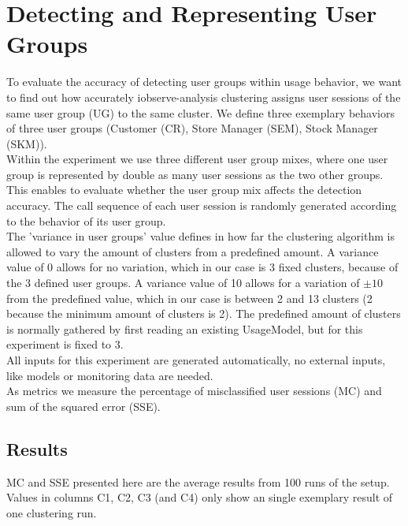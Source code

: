 \documentclass[10pt,a4paper]{article}
\begin{document}
	\section{Detecting and Representing User Groups}
	To evaluate the accuracy of detecting user groups within usage behavior, we want to find out how accurately iobserve-analysis clustering assigns user sessions of the same user group (UG) to the same cluster. We define three exemplary behaviors of three user groups (Customer (CR), Store Manager (SEM), Stock Manager (SKM)).\\
	Within the experiment we use three different user group mixes, where one user group is represented by double as many user sessions as the two other groups. This enables to evaluate whether the user group mix affects the detection accuracy. The call sequence of each user session is randomly generated according to the behavior of its user group.\\
	The 'variance in user groups' value defines in how far the clustering algorithm is allowed to vary the amount of clusters from a predefined amount. A variance value of 0 allows for no variation, which in our case is 3 fixed clusters, because of the 3 defined user groups. A variance value of 10 allows for a variation of $\pm 10 $ from the predefined value, which in our case is between 2 and 13 clusters (2 because the minimum amount of clusters is 2). The predefined amount of clusters is normally gathered by first reading an existing UsageModel, but for this experiment is fixed to 3.\\
	All inputs for this experiment are generated automatically, no external inputs, like models or monitoring data are needed.\\
	As metrics we measure the percentage of misclassified user sessions (MC) and sum of the squared error (SSE). 
	\subsection{Results}
	MC and SSE presented here are the average results from 100 runs of the setup. Values in columns C1, C2, C3 (and C4) only show an single exemplary result of one clustering run.
\end{document}
